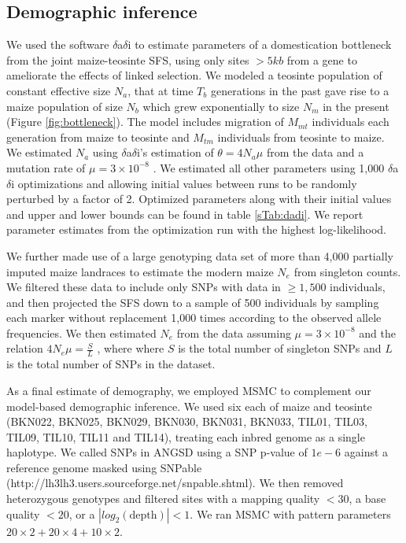 \documentclass{pnastwo}
\begin{document}
\begin{article}
\begin{materials}
\subsection{Demographic inference}
We used the software $\delta$a$\delta$i \cite{gutenkunst2009} to estimate parameters of a domestication bottleneck from the joint maize-teosinte SFS, using only sites $>5 kb$ from a gene to ameliorate the effects of linked selection.
We modeled a teosinte population of constant effective size $N_a$, that at time $T_b$ generations in the past gave rise to a maize population of size $N_b$ which grew exponentially to size $N_m$ in the present (Figure \ref{fig:bottleneck}).
The model includes migration of $M_{mt}$ individuals each generation from maize to teosinte and $M_{tm}$ individuals from teosinte to maize.  We estimated $N_a$ using $\delta$a$\delta$i's estimation of $\theta=4N_a\mu$ from the data and a mutation rate of $\mu = 3 \times 10^{-8}$ \cite{clark2005}. 
We estimated all other parameters using 1,000 $\delta$a$\delta$i optimizations and allowing initial values between runs to be randomly perturbed by a factor of 2.  
Optimized parameters along with their initial values and upper and lower bounds can be found in table \ref{sTab:dadi}. We report parameter estimates from the optimization run with the highest log-likelihood.

We further made use of a large genotyping data set of more than 4,000 partially imputed maize landraces \cite{Hearne2015} to estimate the modern maize $N_e$ from singleton counts. 
We filtered these data to include only SNPs with data in $\geq 1,500$ individuals, and then projected the SFS down to a sample of 500 individuals by sampling each marker without replacement 1,000 times according to the observed allele frequencies.
We then estimated $N_e$ from the data assuming $\mu = 3 \times 10^{-8}$ \cite{clark2005} and the relation  $4N_e\mu = \frac{S}{L}$ \cite{fu1993}, where where $S$ is the total number of singleton SNPs and $L$ is the total number of SNPs in the dataset.

As a final estimate of demography, we employed MSMC \cite{schiffels2014}  to complement our model-based demographic inference. 
We used six each of maize and teosinte (BKN022, BKN025, BKN029, BKN030, BKN031, BKN033, TIL01, TIL03, TIL09, TIL10, TIL11 and TIL14), treating each inbred genome as a single haplotype.
We called SNPs in ANGSD \cite{korneliussen2014} using a SNP p-value of $1e-6$ against a reference genome masked using SNPable (http://lh3lh3.users.sourceforge.net/snpable.shtml). 
We then removed heterozygous genotypes and filtered sites with a mapping quality $<30$, a base quality $<20$, or a $|\textit{log}_2(\text{depth})|<1$.
We ran MSMC with pattern parameters $20\times2+20\times4+10\times2$.


\end{materials}
\end{article}
\end{document}
